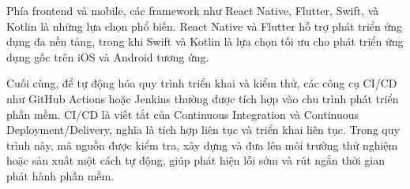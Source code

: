        Phía frontend và mobile, các framework như React Native, Flutter, Swift, và Kotlin là những lựa chọn phổ biến. React Native và Flutter hỗ trợ phát triển ứng dụng đa nền tảng, trong khi Swift và Kotlin là lựa chọn tối ưu cho phát triển ứng dụng gốc trên iOS và Android tương ứng.
      
        \vspace{0.5em}
      
        Cuối cùng, để tự động hóa quy trình triển khai và kiểm thử, các công cụ CI/CD như GitHub Actions hoặc Jenkins thường được tích hợp vào chu trình phát triển phần mềm. CI/CD là viết tắt của Continuous Integration và Continuous Deployment/Delivery, nghĩa là tích hợp liên tục và triển khai liên tục. Trong quy trình này, mã nguồn được kiểm tra, xây dựng và đưa lên môi trường thử nghiệm hoặc sản xuất một cách tự động, giúp phát hiện lỗi sớm và rút ngắn thời gian phát hành phần mềm.
      
   